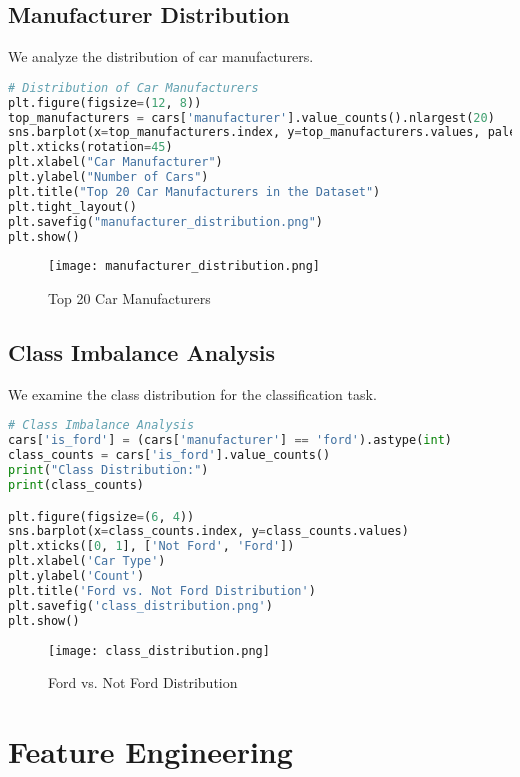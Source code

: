 \documentclass{article}
\begin{document}
\subsection{Manufacturer Distribution}

We analyze the distribution of car manufacturers.

\begin{lstlisting}[language=Python]
# Distribution of Car Manufacturers
plt.figure(figsize=(12, 8))
top_manufacturers = cars['manufacturer'].value_counts().nlargest(20)
sns.barplot(x=top_manufacturers.index, y=top_manufacturers.values, palette="viridis")
plt.xticks(rotation=45)
plt.xlabel("Car Manufacturer")
plt.ylabel("Number of Cars")
plt.title("Top 20 Car Manufacturers in the Dataset")
plt.tight_layout()
plt.savefig("manufacturer_distribution.png")
plt.show()
\end{lstlisting}

\begin{figure}[H]
    \centering
    \texttt{[image: manufacturer\_distribution.png]}
    \caption{Top 20 Car Manufacturers}
\end{figure}

\subsection{Class Imbalance Analysis}

We examine the class distribution for the classification task.

\begin{lstlisting}[language=Python]
# Class Imbalance Analysis
cars['is_ford'] = (cars['manufacturer'] == 'ford').astype(int)
class_counts = cars['is_ford'].value_counts()
print("Class Distribution:")
print(class_counts)

plt.figure(figsize=(6, 4))
sns.barplot(x=class_counts.index, y=class_counts.values)
plt.xticks([0, 1], ['Not Ford', 'Ford'])
plt.xlabel('Car Type')
plt.ylabel('Count')
plt.title('Ford vs. Not Ford Distribution')
plt.savefig('class_distribution.png')
plt.show()
\end{lstlisting}

\begin{figure}[H]
    \centering
    \texttt{[image: class\_distribution.png]}
    \caption{Ford vs. Not Ford Distribution}
\end{figure}

\section{Feature Engineering}
\end{document}

